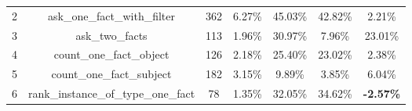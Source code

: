 \begin{table}[h!]
{\begin{tabular}{|c|c|cc|cc|c|}
    2                            & ask\_one\_fact\_with\_filter                                                                                           & 362                                                 & 6.27\%                                                                          & 45.03\%                                                                                                & 42.82\%                                                                                & 2.21\%                                  \\
    3                            & ask\_two\_facts                                                                                                        & 113                                                 & 1.96\%                                                                          & 30.97\%                                                                                                & 7.96\%                                                                                 & 23.01\%                                 \\
    4                            & count\_one\_fact\_object                                                                                               & 126                                                 & 2.18\%                                                                          & 25.40\%                                                                                                & 23.02\%                                                                                & 2.38\%                                  \\
    5                            & count\_one\_fact\_subject                                                                                              & 182                                                 & 3.15\%                                                                          & 9.89\%                                                                                                 & 3.85\%                                                                                 & 6.04\%                                  \\
    6                            & rank\_instance\_of\_type\_one\_fact                                                                                    & 78                                                  & 1.35\%                                                                          & 32.05\%                                                                                                & 34.62\%                                                                                & \textbf{-2.57\%}                        \\

\end{tabular}}
\end{table}
